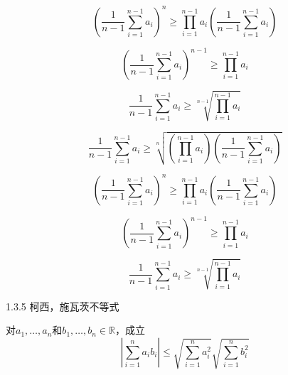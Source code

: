 \documentclass[10pt,a4paper]{article}
\begin{document}
	\begin{equation}	
		(\frac{1}{n-1}\sum_{i=1}^{n-1}a_i)^n
		\geq \prod_{i=1}^{n-1}a_i(\frac{1}{n-1}\sum_{i=1}^{n-1}a_i)
	\end{equation}
	

	\begin{equation}	
		(\frac{1}{n-1}\sum_{i=1}^{n-1}a_i)^{n-1}
		\geq \prod_{i=1}^{n-1}a_i
	\end{equation}


	\begin{equation}		
		\frac{1}{n-1}\sum_{i=1}^{n-1}a_i
		\geq \sqrt[n-1]{\prod_{i=1}^{n-1}a_i}
	\end{equation}


	\begin{equation}
		\frac{1}{n-1}\sum_{i=1}^{n-1}a_i \geq \sqrt[n]{(\prod_{i=1}^{n-1}a_i)(\frac{1}{n-1}\sum_{i=1}^{n-1}a_i)}
	\end{equation}
	
	\begin{equation}
		( \frac{1}{n-1}\sum_{i=1}^{n-1}a_i )^n \geq \prod_{i=1}^{n-1}a_i(\frac{1}{n-1}\sum_{i=1}^{n-1}a_i)
	\end{equation}

	\begin{equation}
		( \frac{1}{n-1}\sum_{i=1}^{n-1}a_i )^{n-1} \geq \prod_{i=1}^{n-1}a_i
	\end{equation}
	
	\begin{equation}
		 \frac{1}{n-1}\sum_{i=1}^{n-1}a_i  \geq \sqrt[n-1]{\prod_{i=1}^{n-1}a_i}
	\end{equation}
	
	
	1.3.5 柯西，施瓦茨不等式
	
	对$ a_1,\dots,a_n $和$ b_1, \dots ,b_n \in \mathbb{R}$，成立
	\begin{equation}
		|\sum_{i=1}^n a_ib_i|\leq \sqrt{\sum_{i=1}^n a_i^2}\sqrt{\sum_{i=1}^n b_i^2}
	\end{equation}
\end{document}
